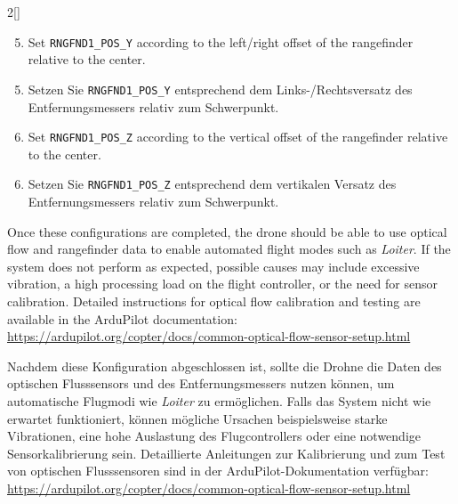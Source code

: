 \begin{paracol}{2}[]
\begin{enumerate} 
\setcounter{enumi}{4}
\item Set \texttt{RNGFND1\_POS\_Y} according to the left/right offset of the rangefinder relative to the center.
\end{enumerate}

\colger

\begin{enumerate}
\setcounter{enumi}{4}
\item Setzen Sie \texttt{RNGFND1\_POS\_Y} entsprechend dem Links-/Rechtsversatz des Entfernungsmessers relativ zum Schwerpunkt.
\end{enumerate}

\coleng

\begin{enumerate} 
\setcounter{enumi}{5}
\item Set \texttt{RNGFND1\_POS\_Z} according to the vertical offset of the rangefinder relative to the center.
\end{enumerate}

\colger

\begin{enumerate}
\setcounter{enumi}{5}
\item Setzen Sie \texttt{RNGFND1\_POS\_Z} entsprechend dem vertikalen Versatz des Entfernungsmessers relativ zum Schwerpunkt.
\end{enumerate}

\coleng

Once these configurations are completed, the drone should be able to use optical flow and rangefinder data to enable automated flight modes such as \textit{Loiter}. If the system does not perform as expected, possible causes may include excessive vibration, a high processing load on the flight controller, or the need for sensor calibration. Detailed instructions for optical flow calibration and testing are available in the ArduPilot documentation: \href{https://ardupilot.org/copter/docs/common-optical-flow-sensor-setup.html}{https://ardupilot.org/copter/docs/common-optical-flow-sensor-setup.html}  

\colger

Nachdem diese Konfiguration abgeschlossen ist, sollte die Drohne die Daten des optischen Flusssensors und des Entfernungsmessers nutzen können, um automatische Flugmodi wie \textit{Loiter} zu ermöglichen. Falls das System nicht wie erwartet funktioniert, können mögliche Ursachen beispielsweise starke Vibrationen, eine hohe Auslastung des Flugcontrollers oder eine notwendige Sensorkalibrierung sein. Detaillierte Anleitungen zur Kalibrierung und zum Test von optischen Flusssensoren sind in der ArduPilot-Dokumentation verfügbar: \href{https://ardupilot.org/copter/docs/common-optical-flow-sensor-setup.html}{https://ardupilot.org/copter/docs/common-optical-flow-sensor-setup.html}  


\end{paracol}

